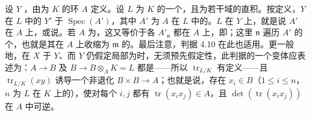 设 $Y$ ，由为 $K$ 的环 $A$ 定义。设 $L$ 为 $K$ 的一个，且为若干域的直积。按定义，$Y$ 在 $L$ 中的 $Y'$ 于 $\operatorname{Spec}(A')$，其中 $A'$ 为 $A$ 在 $L$ 中的。$L$ 在 $Y$ 上，就是说 $A'$ 在 $A$ 上，或说。若 $A$ 为，这又等价于各 $A'_{\mathfrak n}$ 都在 $A$ 上，即；这里 $\mathfrak n$ 遍历 $A'$ 的个，也就是其在 $A$ 上收缩为 $\mathfrak m$ 的。最后注意，判据 4.10 在此也适用。更一般地，在 $X$ 于 $Y$、而 $Y$ 仍假定局部为时，无须预先假定性，此判据的一个变体应表述为：$A\to B$ 及 $B\to B\otimes_A K=L$ 都是——所以 $\operatorname{tr}_{L/K}$ 有定义——且 $\operatorname{tr}_{L/K}(xy)$ 诱导一个非退化 $B\times B\to A$；也就是说，存在 $x_i\in B$（$1\leq i\leq n$，$n$ 为 $L$ 在 $K$ 上的），使对每个 $i,j$ 都有 $\operatorname{tr}(x_ix_j)\in A$，且 $\det(\operatorname{tr}(x_ix_j))$ 在 $A$ 中可逆。

